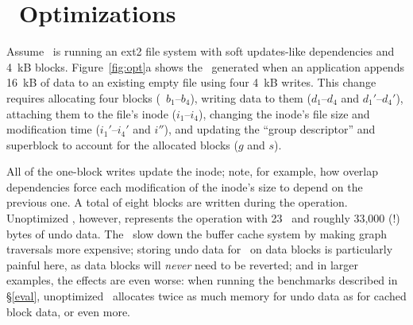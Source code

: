 
\section{\Patch\ Optimizations}
\label{sec:patch:optimizations}

\begin{comment}
A naive \Featherstitch\ implementation 
%
allows file system modules to define and modify consistency-preserving
orderings, and allows applications to add consistency requirements of their
own (using the interface described below).
%
But although all this is relatively easy, it performs badly.
\end{comment}


Assume \Kudos\ is running an ext2 file system with soft updates-like
dependencies and 4~kB blocks.
%
Figure~\ref{fig:opt}a shows the \patches\ generated when an application appends
16~kB of data to an existing empty file using four 4~kB writes.
%
%
%
%
This change requires allocating four blocks (\patches\ $b_1$--$b_4$),
writing data to them ($d_1$--$d_4$ and $d_1'$--$d_4'$), attaching them to the file's
inode ($i_1$--$i_4$), changing the inode's file size and modification time
($i_1'$--$i_4'$ and $i''$), and updating the ``group descriptor'' and superblock to
account for the allocated blocks ($g$ and $s$).
%
\begin{comment}
The operation is broken into four one-block appends; the numeric subscripts in
the \patch\ labels indicate with which each \patch\ is associated.
\end{comment}
%
All of the one-block writes update the inode; note, for example, how overlap
dependencies force each modification of the inode's size to depend on the
previous one.
%
A total of eight blocks are written during the operation.
%
Unoptimized \Kudos, however, represents the operation with 23 \patches\ and
roughly 33,000 (!) bytes of undo data.
%
The \patches\ slow down the buffer cache system by making graph traversals
more expensive;
%
storing undo data for \patches\ on data blocks is particularly painful
here, as data blocks will \emph{never} need to be reverted;
%
and in larger examples, the effects are even worse: when running the
benchmarks described in \S\ref{eval}, unoptimized \Kudos\ allocates twice
as much memory for undo data as for cached block data, or even more.


